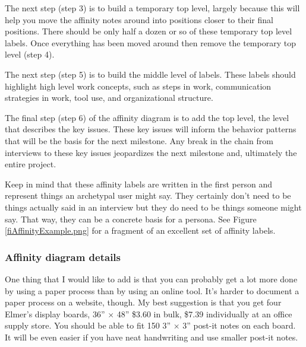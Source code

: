 The next step (step 3) is to build a temporary top level, largely
because this will help you move the affinity notes around into positions
closer to their final positions. There should be only half a dozen or so
of these temporary top level labels. Once everything has been moved
around then remove the temporary top level (step 4).

The next step (step 5) is to build the middle level of labels. These
labels should highlight high level work concepts, such as steps in work,
communication strategies in work, tool use, and organizational
structure.

The final step (step 6) of the affinity diagram is to add the top level,
the level that describes the key issues. These key issues will inform
the behavior patterns that will be the basis for the next milestone. Any
break in the chain from interviews to these key issues jeopardizes the
next milestone and, ultimately the entire project.

Keep in mind that these affinity labels are written in the first person
and represent things an archetypal user might say. They certainly don't
need to be things actually said in an interview but they do need to be
things someone might say. That way, they can be a concrete basis for a
persona. See Figure \ref{fiAffinityExample.png} for a fragment of an
excellent set of affinity labels.


\hypertarget{affinity-diagram-details}{%
\subsubsection{Affinity diagram
details}\label{affinity-diagram-details}}

One thing that I would like to add is that you can probably get a lot
more done by using a paper process than by using an online tool. It's
harder to document a paper process on a website, though. My best
suggestion is that you get four Elmer's display boards, 36'' \(\times\)
48'' \$3.60 in bulk, \$7.39 individually at an office supply store. You
should be able to fit 150 3'' \(\times\) 3'' post-it notes on each
board. It will be even easier if you have neat handwriting and use
smaller post-it notes.

